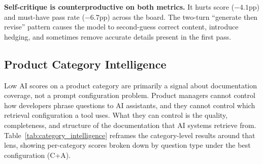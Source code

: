 \documentclass[10pt,letterpaper]{article}
\begin{document}
\textbf{Self-critique is counterproductive on both metrics.} It hurts score ($-4.1$pp) and must-have pass rate ($-6.7$pp) across the board. The two-turn ``generate then revise'' pattern causes the model to second-guess correct content, introduce hedging, and sometimes remove accurate details present in the first pass.

\subsection{Product Category Intelligence}
\label{sec:category_intelligence}

Low AI scores on a product category are primarily a signal about documentation coverage, not a prompt configuration problem. Product managers cannot control how developers phrase questions to AI assistants, and they cannot control which retrieval configuration a tool uses. What they can control is the quality, completeness, and structure of the documentation that AI systems retrieve from. Table~\ref{tab:category_intelligence} reframes the category-level results around that lens, showing per-category scores broken down by question type under the best configuration (C+A).
\end{document}
